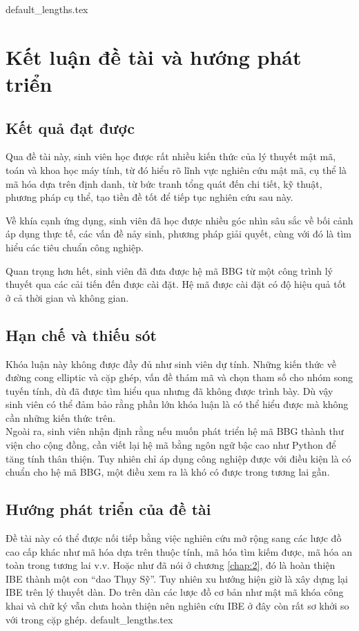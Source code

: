 \documentclass[class=report, crop=false]{standalone}
\begin{document}
	{default_lengths.tex}
	\chapter{Kết luận đề tài và hướng phát triển}\label{chap:7}
	\section{Kết quả đạt được}
		Qua đề tài này, sinh viên học được rất nhiều kiến thức của lý thuyết mật mã, toán và khoa học máy tính, từ đó hiểu rõ lĩnh vực nghiên cứu mật mã, cụ thể là mã hóa dựa trên định danh, từ bức tranh tổng quát đến chi tiết, kỹ thuật, phương pháp cụ thể, tạo tiền đề tốt để tiếp tục nghiên cứu sau này.

		Về khía cạnh ứng dụng, sinh viên đã học được nhiều góc nhìn sâu sắc về bối cảnh áp dụng thực tế, các vấn đề nảy sinh, phương pháp giải quyết, cùng với đó là tìm hiểu các tiêu chuẩn công nghiệp.
		
		Quan trọng hơn hết, sinh viên đã đưa được hệ mã BBG từ một công trình lý thuyết qua các cải tiến đến được cài đặt. Hệ mã được cài đặt có độ hiệu quả tốt ở cả thời gian và không gian.
	\section{Hạn chế và thiếu sót}
		Khóa luận này không được đầy đủ như sinh viên dự tính. Những kiến thức về đường cong elliptic và cặp ghép, vấn đề thám mã và chọn tham số cho nhóm song tuyến tính, dù đã được tìm hiểu qua nhưng đã không được trình bày. Dù vậy sinh viên có thể đảm bảo rằng phần lớn khóa luận là có thể hiểu được mà không cần những kiến thức trên. \\

		Ngoài ra, sinh viên nhận định rằng nếu muốn phát triển hệ mã BBG thành thư viện cho cộng đồng, cần viết lại hệ mã bằng ngôn ngữ bậc cao như Python để tăng tính thân thiện. Tuy nhiên chỉ áp dụng công nghiệp được với điều kiện là có chuẩn cho hệ mã BBG, một điều xem ra là khó có được trong tương lai gần.
	\section{Hướng phát triển của đề tài}
		Đề tài này có thể được nối tiếp bằng việc nghiên cứu mở rộng sang các lược đồ cao cấp khác như mã hóa dựa trên thuộc tính, mã hóa tìm kiếm được, mã hóa an toàn trong tương lai v.v. Hoặc như đã nói ở chương \ref{chap:2}, đó là hoàn thiện IBE thành một con ``dao Thụy Sỹ''. Tuy nhiên xu hướng hiện giờ là xây dựng lại IBE trên lý thuyết dàn. Do trên dàn các lược đồ cơ bản như mật mã khóa công khai và chữ ký vẫn chưa hoàn thiện nên nghiên cứu IBE ở đây còn rất sơ khởi so với trong cặp ghép.
	\newpage
	{default_lengths.tex}
\end{document}
